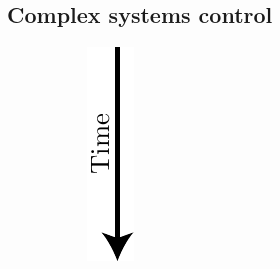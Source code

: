 \subsection{Complex systems control}\label{sec:compl-syst-contr}

\begin{figure}[htbp]
  \centering
  \begin{subfigure}[t]{.04\linewidth}
    \centering
    \includegraphics[width=\linewidth]{figures/arrow}

\end{subfigure}
\end{figure}
